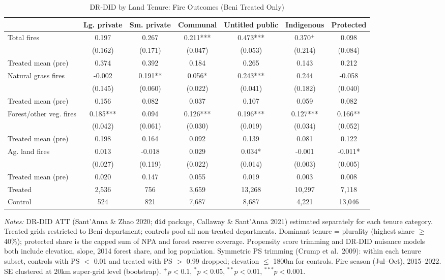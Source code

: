 \begin{table}[htbp]
\centering
\small
\caption{DR-DID by Land Tenure: Fire Outcomes (Beni Treated Only)}
\label{tab:did_drdid_fire_bydept_beni}
\begin{tabular}{lcccccc}
\toprule
 & Lg. private & Sm. private & Communal & Untitled public & Indigenous & Protected \\
\midrule
Total fires & 0.197 & 0.267 & 0.211*** & 0.473*** & 0.370$^{+}$ & 0.098 \\
 & (0.162) & (0.171) & (0.047) & (0.053) & (0.214) & (0.084) \\
Treated mean (pre) & 0.374 & 0.392 & 0.184 & 0.265 & 0.143 & 0.212 \\
[0.5em]
Natural grass fires & -0.002 & 0.191** & 0.056* & 0.243*** & 0.244 & -0.058 \\
 & (0.145) & (0.060) & (0.022) & (0.041) & (0.182) & (0.040) \\
Treated mean (pre) & 0.156 & 0.082 & 0.037 & 0.107 & 0.059 & 0.082 \\
[0.5em]
Forest/other veg. fires & 0.185*** & 0.094 & 0.126*** & 0.196*** & 0.127*** & 0.166** \\
 & (0.042) & (0.061) & (0.030) & (0.019) & (0.034) & (0.052) \\
Treated mean (pre) & 0.198 & 0.164 & 0.092 & 0.139 & 0.081 & 0.122 \\
[0.5em]
Ag. land fires & 0.013 & -0.018 & 0.029 & 0.034* & -0.001 & -0.011* \\
 & (0.027) & (0.119) & (0.022) & (0.014) & (0.003) & (0.005) \\
Treated mean (pre) & 0.020 & 0.147 & 0.055 & 0.019 & 0.003 & 0.008 \\
\midrule
Treated & 2,536 & 756 & 3,659 & 13,268 & 10,297 & 7,118 \\
Control & 524 & 821 & 7,687 & 8,687 & 4,221 & 13,046 \\
\bottomrule
\end{tabular}
\begin{tablenotes}[flushleft]
\small
\item \textit{Notes:} DR-DID ATT (Sant'Anna \& Zhao 2020; \texttt{did} package, Callaway \& Sant'Anna 2021) estimated separately for each tenure category. Treated grids restricted to Beni department; controls pool all non-treated departments. Dominant tenure = plurality (highest share $\geq$ 40\%); protected share is the capped sum of NPA and forest reserve coverage. Propensity score trimming and DR-DID nuisance models both include elevation, slope, 2014 forest share, and log population. Symmetric PS trimming (Crump et al.\ 2009): within each tenure subset, controls with PS $<$ 0.01 and treated with PS $>$ 0.99 dropped; elevation $\leq$ 1800m for controls. Fire season (Jul--Oct), 2015--2022. SE clustered at 20km super-grid level (bootstrap). $^{+}p<0.1$, $^{*}p<0.05$, $^{**}p<0.01$, $^{***}p<0.001$.
\end{tablenotes}
\end{table}
